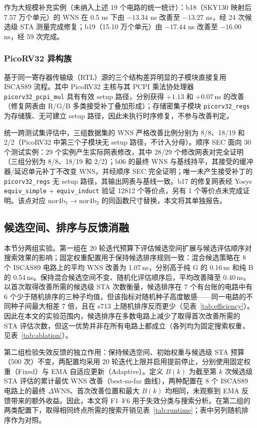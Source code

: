 \documentclass[twocolumn,10pt,fontset=windows]{ctexart}
\begin{document}
作为大规模补充实例（未纳入上述 19 个电路的统一统计）：b18（SKY130 映射后 7.57 万个单元）的 WNS 在 0.5 ns 下由 $-13.34$ ns 改善至 $-13.27$ ns，经 24 次候选级 STA 测量完成修复；b19（15.10 万个单元）由 $-17.44$ ns 改善至 $-16.00$ ns，经 59 次完成。

\subsubsection{PicoRV32 异构族}

基于同一寄存器传输级（RTL）源的三个结构差异明显的子模块直接复用 ISCAS89 流程。其中 PicoRV32 主核与其 PCPI 乘法协处理器 \texttt{picorv32\_pcpi\_mul} 具有有效 setup 路径，分别获得 $+1.13$ 和 $+0.07\,$ns 的改善（修复网表由 R/G/B 多类接受补丁叠加形成）；存储密集子模块 \texttt{picorv32\_regs} 为存储簇、无可建立 setup 路径，因此未执行时序修复，不参与改善判定。

统一跨测试集评估中，三组数据集的 WNS 严格改善比例分别为 8/8、18/19 和 2/2（PicoRV32 中第三个子模块无 setup 路径，不计入分母）。顺序 SEC 面向 30 个测试实例：29 个实例产生实际网表修改，其中 28/29 个修改网表对完全证明（三组分别为 8/8、18/19 和 2/2）；b06 的最终 WNS 与基线持平，其接受的缓冲器/延迟单元补丁不改变 WNS，并经顺序 SEC 完全证明；唯一未产生接受补丁的 \texttt{picorv32\_regs} 无 setup 路径，其输出网表与基线一致。b17 的修复网表经 Yosys \texttt{equiv\_simple} + \texttt{equiv\_induct} 验证 12812 个等价点，另有 1 个等价点未完成证明。该点对应 nor4b$_1\!\to\!$nor4b$_2$ 的同函数尺寸替换，本文将其单独报告。

\subsection{候选空间、排序与反馈消融}\label{sec:ablation}

本节分两组实验。第一组在 20 轮迭代预算下评估候选空间扩展与候选评估顺序对搜索效果的影响；固定权重配置用于保持候选排序规则一致：混合候选策略在 8 个 ISCAS89 电路上的平均 WNS 改善为 1.07\,ns，分别高于纯 G 的 0.16\,ns 和纯 B 的 0.54\,ns。保持混合候选空间不变、随机化评估顺序后，平均改善降至 0.40\,ns。以首次取得改善所需的候选级 STA 次数衡量，候选排序在 7 个有台账的电路中有 6 个少于随机排序的三种子均值，但该指标对随机种子高度敏感——同一电路的不同种子间最大相差 7 倍，且在 s713 上随机排序反而更少（见表~\ref{tab:efficiency}）。因此在本文的实验范围内，候选排序在多数电路上减少了取得首次改善所需的 STA 评估次数，但这一优势并非在所有电路上都成立（各列均为固定搜索权重，见表~\ref{tab:ablation}）。

第二组检验失效反馈的独立作用：保持候选空间、初始权重与候选级 STA 预算（500 次）不变，两配置均采用 20 轮迭代上限并启用提前停止，分别使用固定权重（Fixed）与 EMA 自适应更新（Adaptive）。定义 $B(k)$ 为截至第 $k$ 次候选级 STA 评估的累计最优 WNS 改善（best-so-far 曲线），两种配置在 8 个 ISCAS89 电路上的最终 $\Delta\mathrm{WNS}$、首次改善位置和最大 $B(k)$ 均相同，未观察到 EMA 反馈带来的额外收益。因此，本文将 F1--F6 用于失效分类与搜索分析。在第二组的两类配置下，取得相同终点所需的搜索开销见表~\ref{tab:runtime}；表中另列随机排序作为对照。
\end{document}
